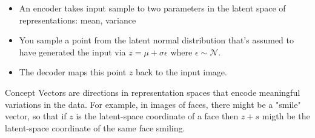 \begin{itemize}
\item An encoder takes input sample to two parameters in the latent space of representations: mean, variance
\item You sample a point from the latent normal distribution that's assumed to have generated the input via $z = \mu + \sigma \epsilon$ where $\epsilon \sim \mathcal{N}$. 
\item The decoder maps this point $z$ back to the input image. 
\end{itemize} 

\label{Concept Vectors}
Concept Vectors are directions in representation spaces that encode meaningful variations in the data. For example, in images of faces, there might be a "smile" vector, so that if $z$ is the latent-space coordinate of a face then $z+s$ migth be the latent-space coordinate of the same face smiling. 
